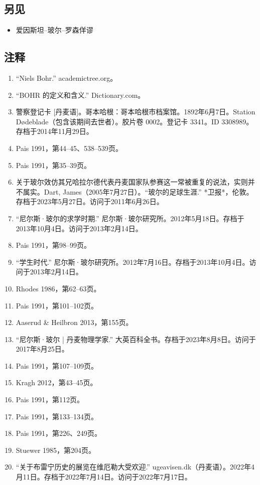 \subsection{另见}
\begin{itemize}
\item 爱因斯坦–玻尔–罗森佯谬
\end{itemize}
\subsection{注释}
\begin{enumerate}
\item “Niels Bohr.” academictree.org。
\item “BOHR 的定义和含义.” Dictionary.com。
\item 警察登记卡 [丹麦语]。哥本哈根：哥本哈根市档案馆。1892年6月7日。Station Dødeblade（包含该期间去世者）。胶片卷 0002。登记卡 3341。ID 3308989。存档于2014年11月29日。
\item Pais 1991，第44–45、538–539页。
\item Pais 1991，第35–39页。
\item 关于玻尔效仿其兄哈拉尔德代表丹麦国家队参赛这一常被重复的说法，实则并不属实。Dart, James（2005年7月27日）。“玻尔的足球生涯.” *卫报*，伦敦。存档于2023年5月27日。访问于2011年6月26日。
\item “尼尔斯·玻尔的求学时期.” 尼尔斯·玻尔研究所。2012年5月18日。存档于2013年10月4日。访问于2013年2月14日。
\item Pais 1991，第98–99页。
\item “学生时代.” 尼尔斯·玻尔研究所。2012年7月16日。存档于2013年10月4日。访问于2013年2月14日。
\item Rhodes 1986，第62–63页。
\item Pais 1991，第101–102页。
\item Aaserud & Heilbron 2013，第155页。
\item “尼尔斯·玻尔 | 丹麦物理学家.” 大英百科全书。存档于2023年8月8日。访问于2017年8月25日。
\item Pais 1991，第107–109页。
\item Kragh 2012，第43–45页。
\item Pais 1991，第112页。
\item Pais 1991，第133–134页。
\item Pais 1991，第226、249页。
\item Stuewer 1985，第204页。
\item “关于布雷宁历史的展览在维厄勒大受欢迎.” ugeavisen.dk（丹麦语）。2022年4月11日。存档于2022年7月14日。访问于2022年7月17日。

\end{enumerate}
